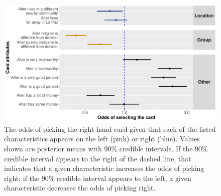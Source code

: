 \documentclass[bibauthoryear]{aa}
\begin{document}
 \begin{figure}[t]
 \centering
\includegraphics[width=5in]{Bolivia_CardChoice_Non-Standardized} %
\caption{{\footnotesize The odds of picking the right-hand card given that each of the listed characteristics appears on the left (pink) or right (blue). Values shown are posterior means with 90\% credible intervals. If the 90\% credible interval appears to the right of the dashed line, that indicates that a given characteristic increases the odds of picking right; if the 90\% credible interval appears to the left, a given characteristic decreases the odds of picking right.}
} \label{boliviacards}
\end{figure}
\end{document}
